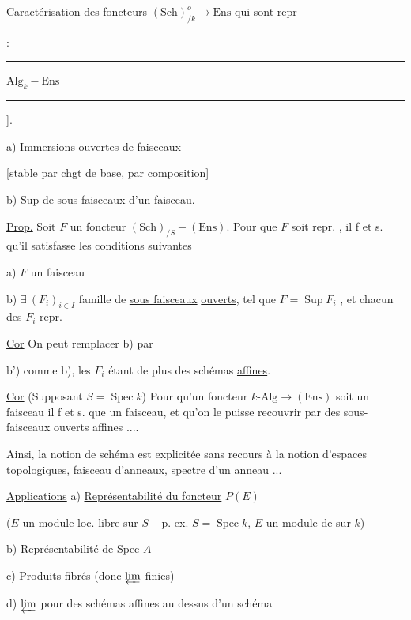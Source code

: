 Caractérisation des foncteurs $(\mathrm{Sch})_{/k}^{o}\longrightarrow\mathrm{Ens}$ qui sont repr

 : \rule{1.7cm}{0.2pt}\quad $\mathrm{Alg}_k\mathrel{-}\mathrm{Ens}$ \rule{2cm}{0.2pt} ].

a) Immersions ouvertes de faisceaux

[stable par chgt de base, par composition]

b) Sup de sous-faisceaux d'un faisceau.

\uline{Prop.} Soit $F$ un foncteur $(\mathrm{Sch})_{/S}\mathrel{-}(\mathrm{Ens})$. Pour que $F$ soit repr. , il f et s. qu'il satisfasse les conditions suivantes

a) $F$ un faisceau

b) $\exists\ (F_i)_{i\in I}$ famille de \uline{sous faisceaux} \uline{ouverts}, tel que $F=\operatorname{Sup} F_i$ , et chacun des $F_i$ repr. 

\uline{Cor} On peut  remplacer b) par

b') comme b), les $F_i$ étant de plus des schémas \uline{affines}.

\uline{Cor} (Supposant $S=\operatorname{Spec} k$) Pour qu'un foncteur $k\text{-}\mathrm{Alg}\longrightarrow(\mathrm{Ens})$ soit un faisceau il f et s. que   un   faisceau, et qu'on le puisse recouvrir par des sous-faisceaux ouverts affines ....

Ainsi, la notion de schéma est explicitée sans recours à la notion d'espaces topologiques, faisceau d'anneaux, spectre d'un anneau ...

\uline{Applications} a) \uline{Représentabilité du foncteur} $P(E)$

($E$ un module loc. libre sur $S$ -- p. ex. $S=\operatorname{Spec} k$, $E$ un module de  sur $k$)

b) \uline{Représentabilité} de \uline{Spec} $A$

c) \uline{Produits fibrés} (donc $\varprojlim$ finies)


d) $\varprojlim$  pour des schémas affines au dessus d'un schéma

